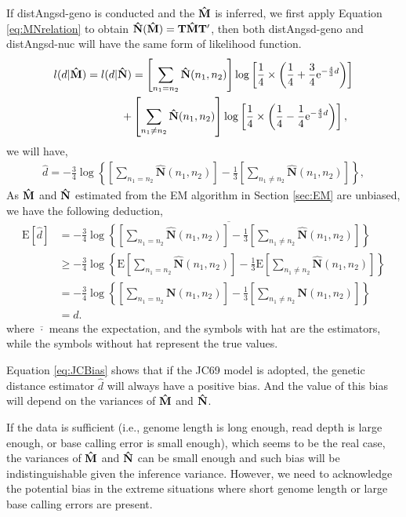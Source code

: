 \documentclass{article}
\begin{document}
If distAngsd-geno is conducted and the $\bf \hat{M}$ is inferred, we first apply Equation \ref{eq:MNrelation} to obtain $\bf \hat{N}(\bf \hat{M})=\bf T\hat{M}T'$, then both distAngsd-geno and distAngsd-nuc will have the same form of likelihood function.
\begin{align*}
l(d|\mathbf{\hat{M}})=l(d|\mathbf{\hat{N}})&=\left[\sum_{n_1=n_2}\mathbf{\hat{N}}(n_1,n_2)\right]\log\left[\frac{1}{4}\times\left(\frac{1}{4}+\frac{3}{4}{\rm e}^{-\frac{4}{3}d}\right)\right]\\
+&\left[\sum_{n_1\neq n_2}\mathbf{\hat{N}}(n_1,n_2)\right]\log\left[\frac{1}{4}\times\left(\frac{1}{4}-\frac{1}{4}{\rm e}^{-\frac{4}{3}d}\right)\right],\\
\end{align*}
we will have,
\begin{align*}
\hat{d}=-\frac{3}{4}\log\left\{\left[\sum_{n_1=n_2}\mathbf{\hat{N}}(n_1,n_2)\right]-\frac{1}{3}\left[\sum_{n_1\neq n_2}\mathbf{\hat{N}}(n_1,n_2)\right]\right\},
\end{align*}
As $\bf \hat{M}$ and $\bf \hat{N}$ estimated from the EM algorithm in Section \ref{sec:EM} are unbiased, we have the following deduction,
\begin{align}
\mathrm{E}\left[\hat{d}\right]&=-\frac{3}{4}\overline{\log\left\{\left[\sum_{n_1=n_2}\mathbf{\hat{N}}(n_1,n_2)\right]-\frac{1}{3}\left[\sum_{n_1\neq n_2}\mathbf{\hat{N}}(n_1,n_2)\right]\right\}} \nonumber\\
&\geq -\frac{3}{4}\log\left\{\mathrm{E}\left[\sum_{n_1=n_2}\mathbf{\hat{N}}(n_1,n_2)\right]-\frac{1}{3}\mathrm{E}\left[\sum_{n_1\neq n_2}\mathbf{\hat{N}}(n_1,n_2)\right]\right\} \nonumber\\
&=-\frac{3}{4}\log\left\{\left[\sum_{n_1=n_2}\mathbf{N}(n_1,n_2)\right]-\frac{1}{3}\left[\sum_{n_1\neq n_2}\mathbf{N}(n_1,n_2)\right]\right\} \nonumber\\
&=d. \label{eq:JCBias}
\end{align}
where $\overline{\cdot}$ means the expectation, and the symbols with hat are the estimators, while the symbols without hat represent the true values.

Equation \ref{eq:JCBias} shows that if the JC69 model is adopted, the genetic distance estimator $\hat{d}$ will always have a positive bias. And the value of this bias will depend on the variances of $\bf \hat{M}$ and $\bf \hat{N}$. 

If the data is sufficient (i.e., genome length is long enough, read depth is large enough, or base calling error is small enough), which seems to be the real case, the variances of $\bf \hat{M}$ and $\bf \hat{N}$ can be small enough and such bias will be indistinguishable given the inference variance. However, we need to acknowledge the potential bias in the extreme situations where short genome length or large base calling errors are present.
\end{document}
